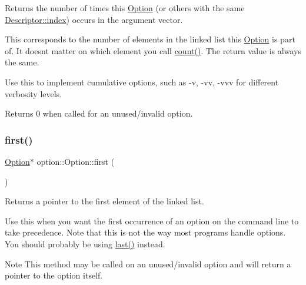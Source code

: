 Returns the number of times this \hyperlink{classoption_1_1_option}{Option} (or others with the same \hyperlink{structoption_1_1_descriptor_a1fee8ac44f529c99ac2b1149b4c391b1}{Descriptor\+::index}) occurs in the argument vector. 

This corresponds to the number of elements in the linked list this \hyperlink{classoption_1_1_option}{Option} is part of. It doesn\textquotesingle{}t matter on which element you call \hyperlink{classoption_1_1_option_ad26a118ffebde656fd82c06709086bed}{count()}. The return value is always the same.

Use this to implement cumulative options, such as -\/v, -\/vv, -\/vvv for different verbosity levels.

Returns 0 when called for an unused/invalid option. \mbox{\label{classoption_1_1_option_abb4e13cd7c90999c8a6b1f871cece283}} 
\subsubsection{\texorpdfstring{first()}{first()}\hspace{0.1cm}{\footnotesize\ttfamily [1/2]}}
{\footnotesize\ttfamily \hyperlink{classoption_1_1_option}{Option}$\ast$ option\+::\+Option\+::first (\begin{DoxyParamCaption}{ }\end{DoxyParamCaption})\hspace{0.3cm}{\ttfamily [inline]}}



Returns a pointer to the first element of the linked list. 

Use this when you want the first occurrence of an option on the command line to take precedence. Note that this is not the way most programs handle options. You should probably be using \hyperlink{classoption_1_1_option_afe2aff68191e55b59c53fac3dbbcd7c3}{last()} instead.

\begin{DoxyNote}{Note}
This method may be called on an unused/invalid option and will return a pointer to the option itself. 
\end{DoxyNote}
\mbox{\label{classoption_1_1_option_a42a48cb7499b93acaf706f25040e44e2}} 
